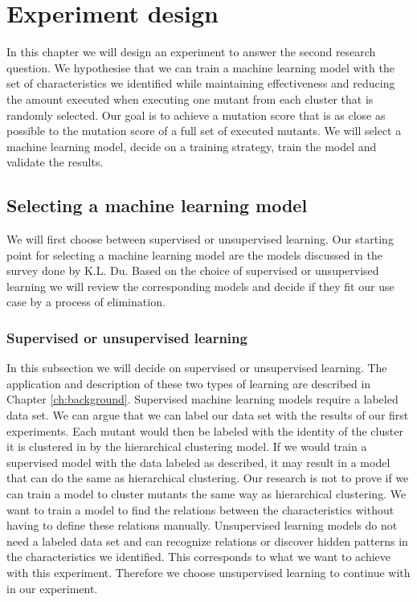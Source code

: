 \documentclass[../../main]{subfiles}
\begin{document}
\section{Experiment design}
In this chapter we will design an experiment to answer the second research question.
We hypothesise that we can train a machine learning model with the set of characteristics we identified
while maintaining effectiveness and reducing the amount executed when executing one mutant from each cluster that is randomly selected.
Our goal is to achieve a mutation score that is as close as possible to the mutation score of a full set of executed mutants.
We will select a machine learning model, decide on a training strategy, train the model and validate the results.

\subsection{Selecting a machine learning model}
We will first choose between supervised or unsupervised learning.
Our starting point for selecting a machine learning model are the models discussed in the survey done by K.L. Du.
Based on the choice of supervised or unsupervised learning we will review the corresponding models and decide if they fit our use case by a process of elimination.

\subsubsection{Supervised or unsupervised learning}
In this subsection we will decide on supervised or unsupervised learning.
The application and description of these two types of learning are described in Chapter \ref{ch:background}.
\newline
Supervised machine learning models require a labeled data set.
We can argue that we can label our data set with the results of our first experiments.
Each mutant would then be labeled with the identity of the cluster it is clustered in by the hierarchical clustering model.
If we would train a supervised model with the data labeled as described, it may result in a model that can do the same as hierarchical clustering.
Our research is not to prove if we can train a model to cluster mutants the same way as hierarchical clustering.
We want to train a model to find the relations between the characteristics without having to define these relations manually.
\newline
Unsupervised learning models do not need a labeled data set and can recognize relations or discover hidden patterns in the characteristics we identified.
This corresponds to what we want to achieve with this experiment.
Therefore we choose unsupervised learning to continue with in our experiment.
\end{document}
